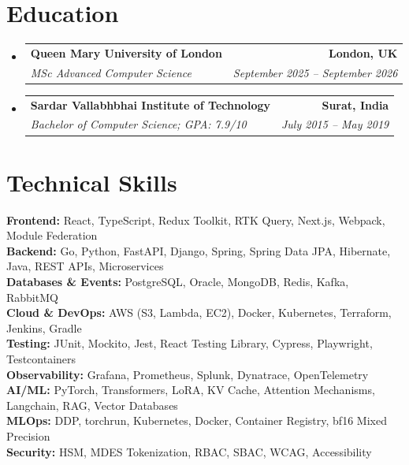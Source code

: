 \documentclass[letterpaper,11pt]{article}
\makeatletter
\newcommand{\resumeSubheading}[4]{
  \vspace{-3pt}\item
    \begin{tabular*}{1.0\textwidth}[t]{l@{\extracolsep{\fill}}r}
      \textbf{#1} & \textbf{\small #2} \\
      \textit{\small#3} & \textit{\small #4} \\
    \end{tabular*}\vspace{-7pt}
}
\newcommand{\resumeSubHeadingListStart}{\begin{itemize}[leftmargin=0.0in, label={}]}
\newcommand{\resumeSubHeadingListEnd}{\end{itemize}}
\makeatother
\begin{document}
\section{Education}
  \resumeSubHeadingListStart
    \resumeSubheading
      {Queen Mary University of London}{London, UK}
      {MSc Advanced Computer Science}{September 2025 -- September 2026}
    \resumeSubheading
      {Sardar Vallabhbhai Institute of Technology}{Surat, India}
      {Bachelor of Computer Science; GPA: 7.9/10}{July 2015 -- May 2019}
  \resumeSubHeadingListEnd

\section{Technical Skills}
\vspace{-7pt}
\begin{itemize}
[leftmargin=0.15in, label={}]\small{\item{
\textbf{Frontend:}{ React, TypeScript, Redux Toolkit, RTK Query, Next.js, Webpack, Module Federation} \\
\textbf{Backend:}{ Go, Python, FastAPI, Django, Spring, Spring Data JPA, Hibernate, Java, REST APIs, Microservices} \\
\textbf{Databases \& Events:}{ PostgreSQL, Oracle, MongoDB, Redis, Kafka, RabbitMQ} \\
\textbf{Cloud \& DevOps:}{ AWS (S3, Lambda, EC2), Docker, Kubernetes, Terraform, Jenkins, Gradle} \\
\textbf{Testing:}{ JUnit, Mockito, Jest, React Testing Library, Cypress, Playwright, Testcontainers} \\
\textbf{Observability:}{ Grafana, Prometheus, Splunk, Dynatrace, OpenTelemetry} \\
\textbf{AI/ML:}{ PyTorch, Transformers, LoRA, KV Cache, Attention Mechanisms, Langchain, RAG, Vector Databases} \\
\textbf{MLOps:}{ DDP, torchrun, Kubernetes, Docker, Container Registry, bf16 Mixed Precision} \\
\textbf{Security:}{ HSM, MDES Tokenization, RBAC, SBAC, WCAG, Accessibility}
}}
\end{itemize}
\end{document}
